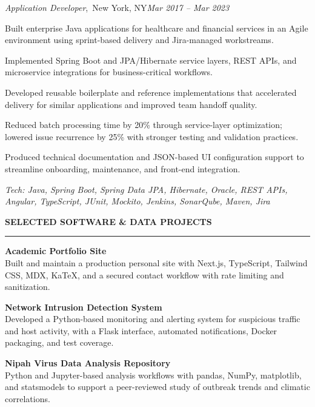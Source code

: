 \documentclass[letterpaper, 11pt]{article}
\newcommand{\rsection}[1]{%
  \vspace{8pt}%
  {\large\textbf{#1}}\\[-5pt]%
  \rule{\textwidth}{0.5pt}%
  \vspace{3pt}%
}
\newcommand{\role}[3]{%
  \vspace{3pt}%
  \noindent\hspace*{1em}\textit{#1},\ #2\hfill\textit{#3}%
}
\begin{document}
\role{Application Developer}{New York, NY}{Mar 2017 -- Mar 2023}
\begin{compactitem}
  \item Built enterprise Java applications for healthcare and financial services in an Agile
        environment using sprint-based delivery and Jira-managed workstreams.
  \item Implemented Spring Boot and JPA/Hibernate service layers, REST APIs, and microservice
        integrations for business-critical workflows.
  \item Developed reusable boilerplate and reference implementations that accelerated delivery
        for similar applications and improved team handoff quality.
  \item Reduced batch processing time by 20\% through service-layer optimization; lowered issue
        recurrence by 25\% with stronger testing and validation practices.
  \item Produced technical documentation and JSON-based UI configuration support to streamline
        onboarding, maintenance, and front-end integration.
\end{compactitem}

\noindent\textit{Tech: Java, Spring Boot, Spring Data JPA, Hibernate, Oracle, REST APIs, Angular,
TypeScript, JUnit, Mockito, Jenkins, SonarQube, Maven, Jira}

\rsection{SELECTED SOFTWARE \& DATA PROJECTS}

\noindent\textbf{Academic Portfolio Site}\\
Built and maintain a production personal site with Next.js, TypeScript, Tailwind CSS, MDX,
KaTeX, and a secured contact workflow with rate limiting and sanitization.

\vspace{4pt}
\noindent\textbf{Network Intrusion Detection System}\\
Developed a Python-based monitoring and alerting system for suspicious traffic and host
activity, with a Flask interface, automated notifications, Docker packaging, and test coverage.

\vspace{4pt}
\noindent\textbf{Nipah Virus Data Analysis Repository}\\
Python and Jupyter-based analysis workflows with pandas, NumPy, matplotlib, and statsmodels
to support a peer-reviewed study of outbreak trends and climatic correlations.
\end{document}
